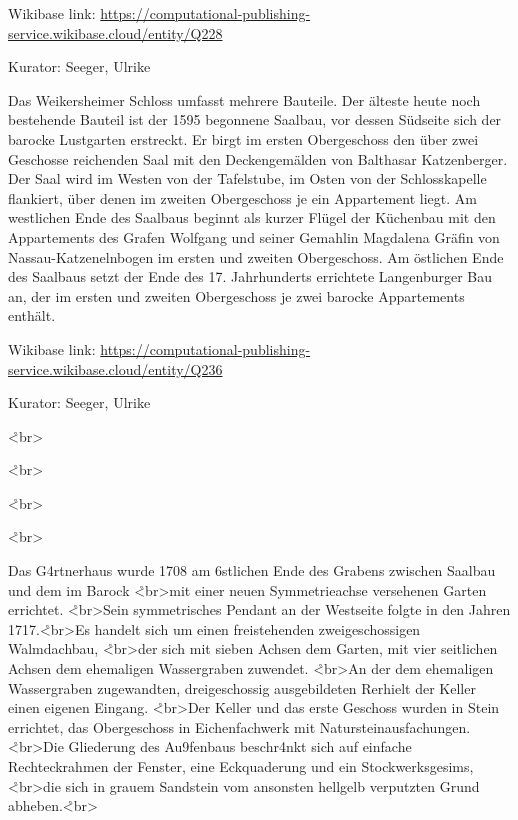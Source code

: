 \documentclass[
  letterpaper,
]{book}
\begin{document}
Wikibase link:
\url{https://computational-publishing-service.wikibase.cloud/entity/Q228}

Kurator: Seeger, Ulrike

Das Weikersheimer Schloss umfasst mehrere Bauteile. Der älteste heute
noch bestehende Bauteil ist der 1595 begonnene Saalbau, vor dessen
Südseite sich der barocke Lustgarten erstreckt. Er birgt im ersten
Obergeschoss den über zwei Geschosse reichenden Saal mit den
Deckengemälden von Balthasar Katzenberger. Der Saal wird im Westen von
der Tafelstube, im Osten von der Schlosskapelle flankiert, über denen im
zweiten Obergeschoss je ein Appartement liegt. Am westlichen Ende des
Saalbaus beginnt als kurzer Flügel der Küchenbau mit den Appartements
des Grafen Wolfgang und seiner Gemahlin Magdalena Gräfin von
Nassau-Katzenelnbogen im ersten und zweiten Obergeschoss. Am östlichen
Ende des Saalbaus setzt der Ende des 17. Jahrhunderts errichtete
Langenburger Bau an, der im ersten und zweiten Obergeschoss je zwei
barocke Appartements enthält.

Wikibase link:
\url{https://computational-publishing-service.wikibase.cloud/entity/Q236}

Kurator: Seeger, Ulrike

\r<br\textgreater{}

\r<br\textgreater{}

\r<br\textgreater{}

\r<br\textgreater{}

Das G\xa4rtnerhaus wurde 1708 am \xb6stlichen
Ende des Grabens zwischen Saalbau und dem im Barock
\r<br\textgreater mit einer neuen Symmetrieachse versehenen Garten
errichtet. \r<br\textgreater Sein symmetrisches Pendant an der Westseite
folgte in den Jahren 1717.\r<br\textgreater Es handelt
sich um einen freistehenden zweigeschossigen Walmdachbau,
\r<br\textgreater der sich mit sieben Achsen dem Garten, mit vier
seitlichen Achsen dem ehemaligen Wassergraben zuwendet.
\r<br\textgreater An der dem ehemaligen Wassergraben zugewandten,
dreigeschossig ausgebildeten R\xbcckseite erhielt der Keller einen
eigenen Eingang. \r<br\textgreater Der Keller und das erste Geschoss
wurden in Stein errichtet, das Obergeschoss in Eichenfachwerk mit
Natursteinausfachungen. \r<br\textgreater Die Gliederung des
Au\x9fenbaus beschr\xa4nkt sich auf einfache Rechteckrahmen der
Fenster, eine Eckquaderung und ein Stockwerksgesims,
\r<br\textgreater die sich in grauem Sandstein vom ansonsten hellgelb
verputzten Grund abheben.\r<br\textgreater{}
\end{document}
